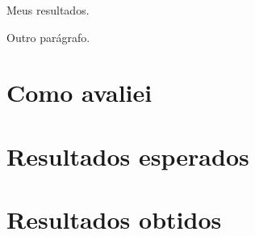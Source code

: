 
Meus resultados.

Outro parágrafo.

\section{Como avaliei}
\section{Resultados esperados}
\section{Resultados obtidos}